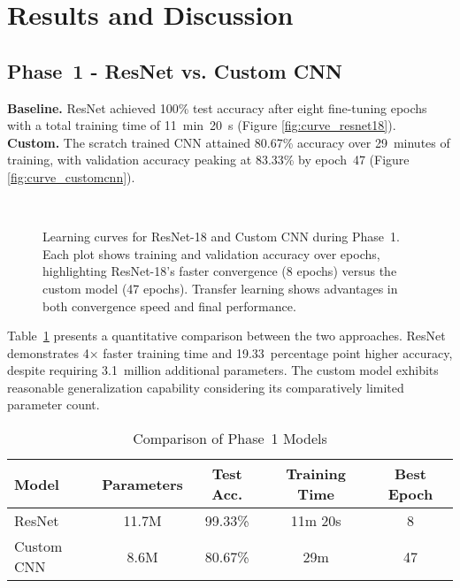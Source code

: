 
\section{Results and Discussion}

\subsection{Phase~1 - ResNet vs. Custom CNN}

\noindent
\textbf{Baseline.} ResNet achieved 100\% test accuracy after eight fine\hyp tuning epochs with a total training time of 11~min~20~s (Figure \autoref{fig:curve_resnet18}).\\
\textbf{Custom.} The scratch trained CNN attained 80.67\% accuracy over 29~minutes of training, with validation accuracy peaking at 83.33\% by epoch~47 (Figure \autoref{fig:curve_customcnn}).



\begin{figure}[htbp]
    \centering
    \\[1ex]
    \caption{Learning curves for ResNet-18 and Custom CNN during Phase~1. Each plot shows training and validation accuracy over epochs, highlighting ResNet-18's faster convergence (8 epochs) versus the custom model (47 epochs). Transfer learning shows advantages in both convergence speed and final performance.}
    \label{fig:learning_curves_phase1}
\end{figure}



\noindent
Table~\ref{tab:phase1} presents a quantitative comparison between the two approaches. ResNet demonstrates 4× faster training time and 19.33~percentage point higher accuracy, despite requiring 3.1~million additional parameters. The custom model exhibits reasonable generalization capability considering its comparatively limited parameter count.
\begin{table}[h!]
\caption{\small Comparison of Phase~1 Models}
\label{tab:phase1}
\centering
\begin{tabular}{lcccc}
\toprule
Model & Parameters & Test Acc. & Training Time & Best Epoch \\
\midrule
ResNet\textendash18 & 11.7M & 99.33\% & 11m 20s & 8 \\
Custom CNN & 8.6M & 80.67\% & 29m & 47 \\
\bottomrule
\end{tabular}
\end{table}

